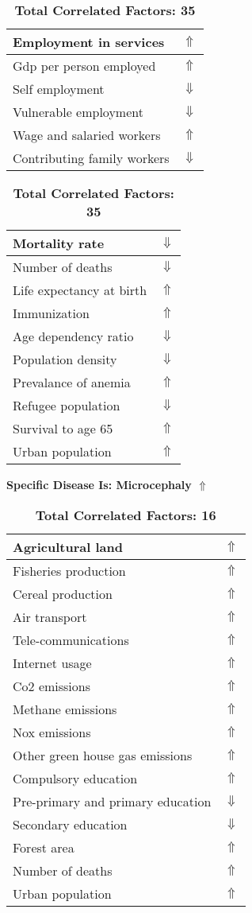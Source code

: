\documentclass[12pt,notitlepage,oneside]{report}
\begin{document}
\begin{table}[!htb]
\begin{tabular}{|l|l|}
Employment in services & $\Uparrow$\\ \hline
Gdp per person employed & $\Uparrow$\\ \hline
Self employment & $\Downarrow$\\ \hline
Vulnerable employment & $\Downarrow$\\ \hline
Wage and salaried workers & $\Uparrow$\\ \hline
Contributing family workers & $\Downarrow$\\ \hline
\end{tabular}
\begin{tabular}{|l|l|}
\hline
Mortality rate & $\Downarrow$\\ \hline
Number of deaths & $\Downarrow$\\ \hline
Life expectancy at birth & $\Uparrow$\\ \hline
Immunization & $\Uparrow$\\ \hline
Age dependency ratio & $\Downarrow$\\ \hline
Population density & $\Downarrow$\\ \hline
Prevalance of anemia & $\Uparrow$\\ \hline
Refugee population & $\Downarrow$\\ \hline
Survival to age 65 & $\Uparrow$\\ \hline
Urban population & $\Uparrow$\\ \hline
\end{tabular}
\caption*{\textbf{Total Correlated Factors: 35}}
\end{table}
\clearpage
\begin{table}[!htb]
\caption{\textbf{Specific Disease Is: Microcephaly $\Uparrow$}}
\centering
\label{Correlated Socio-economic Factors0}
\begin{tabular}{|l|l|}
\hline
Agricultural land & $\Uparrow$\\ \hline
Fisheries production & $\Uparrow$\\ \hline
Cereal production & $\Uparrow$\\ \hline
Air transport  & $\Uparrow$\\ \hline
Tele-communications & $\Uparrow$\\ \hline
Internet usage & $\Uparrow$\\ \hline
Co2 emissions & $\Uparrow$\\ \hline
Methane emissions & $\Uparrow$\\ \hline
Nox emissions & $\Uparrow$\\ \hline
Other green house gas emissions & $\Uparrow$\\ \hline
Compulsory education & $\Uparrow$\\ \hline
Pre-primary and primary education & $\Downarrow$\\ \hline
Secondary education & $\Downarrow$\\ \hline
Forest area & $\Uparrow$\\ \hline
Number of deaths & $\Uparrow$\\ \hline
Urban population & $\Uparrow$\\ \hline
\end{tabular}
\caption*{\textbf{Total Correlated Factors: 16}}
\end{table}
\end{document}
